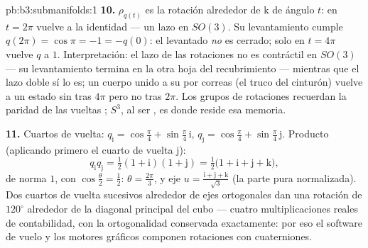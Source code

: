 \begin{solution}{pb:b3:submanifolds:1}
\textbf{10.} $\rho_{q(t)}$ es la rotación alrededor de $\mathrm k$ de
ángulo $t$: en $t = 2\pi$ vuelve a la identidad --- un lazo en $SO(3)$.
Su levantamiento cumple $q(2\pi) = \cos\pi =
-1 = -q(0)$: el  levantado
\emph{no} es cerrado; solo en $t = 4\pi$ vuelve $q$ a $1$.
Interpretación: el lazo de las rotaciones  no es contráctil en
$SO(3)$ --- su levantamiento termina en la otra hoja del recubrimiento
--- mientras que el lazo doble sí lo es; un cuerpo unido a su 
por correas (el truco del cinturón) vuelve a un estado sin  tras
$4\pi$ pero no tras $2\pi$. Los grupos de rotaciones recuerdan la
paridad de las vueltas ; $S^3$, al ser
, es donde
reside esa memoria.

\textbf{11.} Cuartos de vuelta: $q_{\mathrm i} =
\cos\frac\pi4 + \sin\frac\pi4\,\mathrm i$, $q_{\mathrm j} =
\cos\frac\pi4 + \sin\frac\pi4\,\mathrm j$. Producto (aplicando primero
el cuarto de vuelta $\mathrm j$):
\[
q_{\mathrm i}q_{\mathrm j} = \tfrac12(1 + \mathrm i)(1 +
\mathrm j) = \tfrac12\bigl(1 + \mathrm i + \mathrm j +
\mathrm k\bigr),
\]
de norma $1$, con $\cos\frac\theta2 = \frac12$: $\theta =
\frac{2\pi}3$, y eje $u = \frac{\mathrm i + \mathrm j +
\mathrm k}{\sqrt3}$ (la parte pura normalizada). Dos cuartos de vuelta
sucesivos alrededor de ejes ortogonales dan una rotación de $120^\circ$
alrededor de la diagonal principal del cubo --- cuatro multiplicaciones
reales de contabilidad, con la ortogonalidad conservada exactamente: por
eso el software de vuelo y los motores gráficos componen rotaciones con
cuaterniones.


\end{solution}
